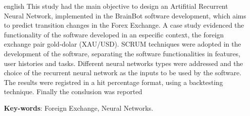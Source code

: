 \begin{resumo}[Abstract]
 \begin{otherlanguage*}{english}
   This study had the main objective to design an Artifitial Recurrent Neural Network,
   implemented in the BrainBot software development, which aims to predict transition
   changes in the Forex Exchange. A case study evidenced the functionality of the software
   developed in an especific context, the foreign exchange pair gold-dolar (XAU/USD).
   SCRUM techniques were adopted in the development of the software, separating the
   software functionalities in features, user histories and tasks. Different neural
   networks types were addressed and the choice of the recurrent neural network as the inputs
   to be used by the software. The results were registred in a hit percentage format,
   using a backtesting technique. Finally the conslusion was reported
   \vspace{\onelineskip}

   \noindent
   \textbf{Key-words}: Foreign Exchange, Neural Networks.
 \end{otherlanguage*}
\end{resumo}
